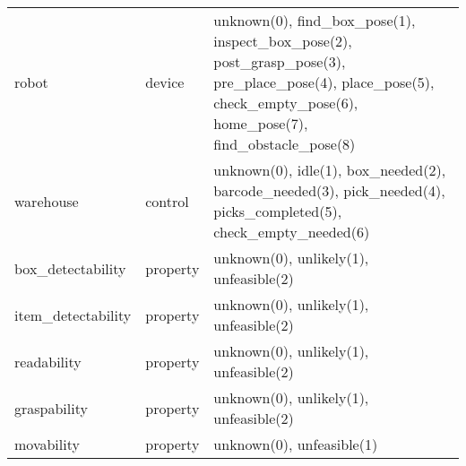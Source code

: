 \documentclass[12pt]{article}
\begin{document}
\begin{table}[]
\begin{tabularx}{\textwidth}{llp{}}
		robot                                      & device     & unknown(0), find\_box\_pose(1), inspect\_box\_pose(2), post\_grasp\_pose(3), pre\_place\_pose(4), place\_pose(5), check\_empty\_pose(6), home\_pose(7), find\_obstacle\_pose(8) \\
		warehouse                                  & control    & unknown(0), idle(1), box\_needed(2), barcode\_needed(3), pick\_needed(4), picks\_completed(5), check\_empty\_needed(6)                                                                 \\
		box\_detectability & property   & unknown(0), unlikely(1), unfeasible(2)                                                                                                                                     \\
		item\_detectability   & property   & unknown(0), unlikely(1), unfeasible(2)                                                                                                                                     \\
		readability        & property   & unknown(0), unlikely(1), unfeasible(2)                                                                                                                                     \\
		graspability          & property   & unknown(0), unlikely(1), unfeasible(2)                                                                                                                                     \\
		movability         & property   & unknown(0), unfeasible(1)  
		\\                                                                                                                                            
	\end{tabularx}
\end{table}
\end{document}

